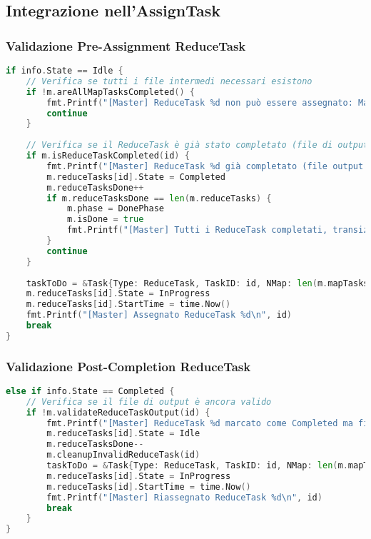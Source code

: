 \documentclass[12pt,a4paper]{article}
\begin{document}
\subsection{Integrazione nell'AssignTask}

\subsubsection{Validazione Pre-Assignment ReduceTask}

\begin{lstlisting}[language=go]
if info.State == Idle {
    // Verifica se tutti i file intermedi necessari esistono
    if !m.areAllMapTasksCompleted() {
        fmt.Printf("[Master] ReduceTask %d non può essere assegnato: MapTask non completati\n", id)
        continue
    }
    
    // Verifica se il ReduceTask è già stato completato (file di output esistente)
    if m.isReduceTaskCompleted(id) {
        fmt.Printf("[Master] ReduceTask %d già completato (file output esistente), marco come Completed\n", id)
        m.reduceTasks[id].State = Completed
        m.reduceTasksDone++
        if m.reduceTasksDone == len(m.reduceTasks) {
            m.phase = DonePhase
            m.isDone = true
            fmt.Printf("[Master] Tutti i ReduceTask completati, transizione a DonePhase\n")
        }
        continue
    }
    
    taskToDo = &Task{Type: ReduceTask, TaskID: id, NMap: len(m.mapTasks)}
    m.reduceTasks[id].State = InProgress
    m.reduceTasks[id].StartTime = time.Now()
    fmt.Printf("[Master] Assegnato ReduceTask %d\n", id)
    break
}
\end{lstlisting}

\subsubsection{Validazione Post-Completion ReduceTask}

\begin{lstlisting}[language=go]
else if info.State == Completed {
    // Verifica se il file di output è ancora valido
    if !m.validateReduceTaskOutput(id) {
        fmt.Printf("[Master] ReduceTask %d marcato come Completed ma file output invalido, resetto a Idle\n", id)
        m.reduceTasks[id].State = Idle
        m.reduceTasksDone--
        m.cleanupInvalidReduceTask(id)
        taskToDo = &Task{Type: ReduceTask, TaskID: id, NMap: len(m.mapTasks)}
        m.reduceTasks[id].State = InProgress
        m.reduceTasks[id].StartTime = time.Now()
        fmt.Printf("[Master] Riassegnato ReduceTask %d\n", id)
        break
    }
}
\end{lstlisting}
\end{document}
